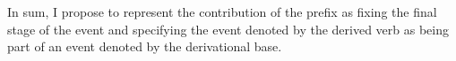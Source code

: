 In sum, I propose to represent the contribution of the prefix  as fixing the final stage of the event and specifying the event denoted by the derived verb as being part of an event denoted by the derivational base.


%


